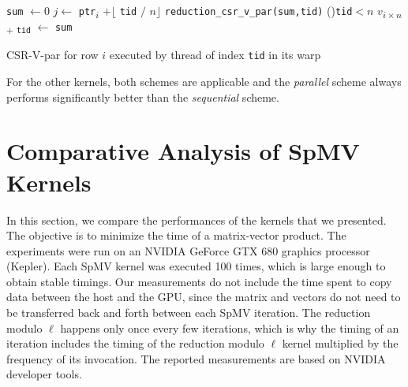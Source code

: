 \documentclass[runningheads,orivec]{llncs}
\begin{document}
\begin{algorithm}[H]
 \small 
 \BlankLine
 \texttt{sum} $\leftarrow 0$
 $j\leftarrow$ \texttt{ptr}\textsubscript{$i$} $+ \lfloor$ \texttt{tid} $/$ $n \rfloor$
   \texttt{reduction\_csr\_v\_par(sum,tid)}\;
  \If(){\texttt{\upshape tid}$<n$}{
  	$v$\textsubscript{$i\times n$ $+$ \texttt{tid}} $\leftarrow$ \texttt{sum}\;
  } 
 \caption{\small CSR-V-par for row $i$ executed by thread of index \texttt{tid} in its warp}
 \label{algo::csr vector-parallel}
\end{algorithm}



\medskip
For the other kernels, both schemes are applicable and the \textit{parallel} scheme always performs significantly better than the \textit{sequential} scheme.

\vspace*{-0.25cm}

\section{Comparative Analysis of SpMV Kernels}
\label{results}
In this section, we compare the performances of the kernels that we presented. The objective is to minimize the time of a matrix-vector product. The experiments were run on an NVIDIA GeForce GTX 680 graphics processor (Kepler). Each SpMV kernel was executed 100 times, which is large enough to obtain stable timings.
Our measurements do not include the time spent to copy data between the host and the GPU, since the matrix and vectors do not need to be transferred back and forth between each SpMV iteration. The reduction modulo $\ell$ happens only once every few iterations, which is why the timing of an iteration includes the timing of the reduction modulo $\ell$ kernel multiplied by the frequency of its invocation. The reported measurements are based on NVIDIA developer tools.
\end{document}
